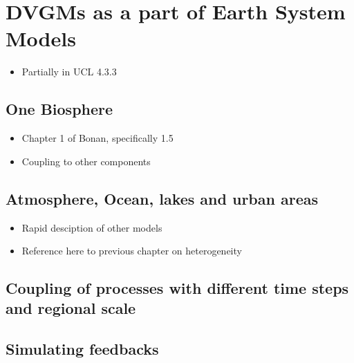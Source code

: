\documentclass[
  oneside]{book}
\providecommand{\tightlist}{%
  \setlength{\itemsep}{0pt}\setlength{\parskip}{0pt}}
\begin{document}
\hypertarget{dvgms-as-a-part-of-earth-system-models}{%
\section{DVGMs as a part of Earth System Models}\label{dvgms-as-a-part-of-earth-system-models}}

\begin{itemize}
\tightlist
\item
  Partially in UCL 4.3.3
\end{itemize}

\hypertarget{one-biosphere}{%
\subsection{One Biosphere}\label{one-biosphere}}

\begin{itemize}
\tightlist
\item
  Chapter 1 of Bonan, specifically 1.5
\item
  Coupling to other components
\end{itemize}

\hypertarget{atmosphere-ocean-lakes-and-urban-areas}{%
\subsection{Atmosphere, Ocean, lakes and urban areas}\label{atmosphere-ocean-lakes-and-urban-areas}}

\begin{itemize}
\tightlist
\item
  Rapid desciption of other models
\item
  Reference here to previous chapter on heterogeneity
\end{itemize}

\hypertarget{coupling-of-processes-with-different-time-steps-and-regional-scale}{%
\subsection{Coupling of processes with different time steps and regional scale}\label{coupling-of-processes-with-different-time-steps-and-regional-scale}}

\hypertarget{simulating-feedbacks}{%
\subsection{Simulating feedbacks}\label{simulating-feedbacks}}
\end{document}
